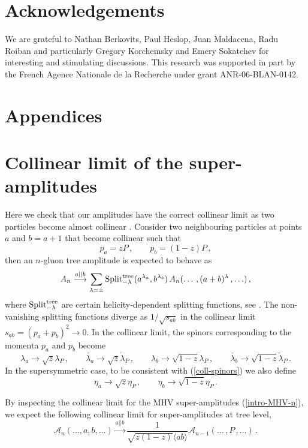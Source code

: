 \documentclass[12pt]{article}
\def \be  {\begin{equation}}
\def \ee  {\end{equation}}
\newcommand \vev [1] {\langle{#1}\rangle}
\begin{document}
{\section*{Acknowledgements}

We are grateful to Nathan Berkovits, Paul Heslop, Juan Maldacena, Radu
Roiban and particularly Gregory Korchemsky and Emery Sokatchev for
interesting and stimulating discussions. This research was supported in part by the French Agence Nationale de la
Recherche under grant ANR-06-BLAN-0142.



\section*{Appendices}

\appendix

\section{Collinear limit of the super-amplitudes}\label{app-collinear}

Here we check that our amplitudes have the correct collinear limit
as two particles become almost collinear \cite{Mangano:1990by}.
Consider two neighbouring particles at points $a$ and $b=a+1$ that
become collinear such that \be p_{a} = z P \,,\qquad p_{b} = (1-z)
P\,, \ee then an $n$-gluon tree amplitude is expected to behave as
\be \label{coll-components} A_{n} \stackrel{a
||b}{\longrightarrow} \sum_{\lambda=\pm} {\rm Split}^{\rm
tree}_{-\lambda}(a^{\lambda_{a}},b^{\lambda_{b}}) \,A_{n}(\ldots
\,,(a+b)^{\lambda}\,, \ldots)\,, \ee where ${\rm Split}^{\rm
tree}_{-\lambda}$ are certain helicity-dependent splitting
functions, see \cite{Mangano:1990by}. The non-vanishing splitting
functions diverge as $1/\sqrt{s_{ab}}$ in the collinear limit
$s_{ab}=(p_{a}+p_{b})^2 \to 0$. In the collinear limit, the
spinors corresponding to the momenta $p_{a}$ and $p_{b}$ become
\be\label{coll-spinors} \lambda_{a} \to \sqrt{z}
\lambda_{P}\,,\qquad \tilde{\lambda_{a}} \to \sqrt{z}
\tilde{\lambda}_{P}\,,\qquad \lambda_{b} \to \sqrt{1-z}
\lambda_{P}\,,\qquad \tilde{\lambda_{b}} \to \sqrt{1-z}
\tilde{\lambda}_{P}\,. \ee In the supersymmetric case, to be
consistent with (\ref{coll-spinors}) we also define\be \eta_{a} \to \sqrt{z}
\eta_{P}\,,\qquad \eta_{b} \to \sqrt{1-z} \eta_{P}\,. \ee

By inspecting the collinear limit for the MHV super-amplitudes
(\ref{intro-MHV-n}), we expect the following collinear limit for
super-amplitudes at tree level, \be \label{coll-super}
\mathcal{A}_{n}(\ldots, a,b,\ldots) \stackrel{a
||b}{\longrightarrow} \frac{1}{\sqrt{z (1-z)} \vev{ab}}
\mathcal{A}_{n-1}(\ldots \,,P\,, \ldots)\,. \ee

}
\end{document}
